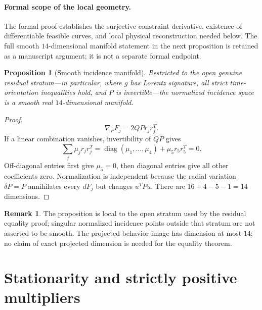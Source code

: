 \documentclass[11pt]{article}
\newtheorem{proposition}[theorem]{Proposition}
\theoremstyle{definition}
\newtheorem{remark}[theorem]{Remark}
\begin{document}
\paragraph{Formal scope of the local geometry.}
The formal proof establishes the surjective constraint derivative,
existence of differentiable feasible curves, and local physical
reconstruction needed below. The full smooth \(14\)-dimensional manifold
statement in the next proposition is retained as a manuscript argument;
it is not a separate formal endpoint.

\begin{proposition}[Smooth incidence manifold]
\label{prop:smooth}
Restricted to the open genuine residual stratum---in particular, where
\(g\) has Lorentz signature, all strict time-orientation inequalities hold,
and \(P\) is invertible---the normalized incidence space is a smooth real
\(14\)-dimensional manifold.
\end{proposition}

\begin{proof}
\[
\nabla_PF_j=2QPr_jr_j^T.
\]
If a linear combination vanishes, invertibility of \(QP\) gives
\[
\sum_j\mu_jr_jr_j^T
=\operatorname{diag}(\mu_1,\ldots,\mu_4)+\mu_5r_5r_5^T=0.
\]
Off-diagonal entries first give \(\mu_5=0\), then diagonal entries give all
other coefficients zero. Normalization is independent because the radial
variation \(\delta P=P\) annihilates every \(dF_j\) but changes \(u^TPu\).
There are \(16+4-5-1=14\) dimensions.
\end{proof}

\begin{remark}
The proposition is local to the open stratum used by the residual equality
proof;
singular normalized incidence points outside that stratum are not asserted to
be smooth. The projected behavior image has dimension at most \(14\); no claim
of exact projected dimension is needed for the equality theorem.
\end{remark}

\section{Stationarity and strictly positive multipliers}
\label{sec:multipliers}
\end{document}
